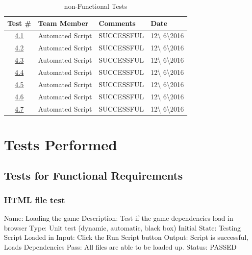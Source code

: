 \documentclass{article}
\begin{document}
\begin{table}[H]
\caption{non-Functional Tests}
	\begin{tabularx}{\textwidth}{| c | l | X | l |}
	\toprule
	Test \#& Team Member &Comments &Date\\
	\midrule
	\hyperref[sec:4.1]{4.1}& Automated Script  & SUCCESSFUL & 12\textbackslash
	6\textbackslash2016\\
	\hyperref[sec:4.2]{4.2}& Automated Script  & SUCCESSFUL & 12\textbackslash
	6\textbackslash2016\\
	\hyperref[sec:4.3]{4.3}& Automated Script  & SUCCESSFUL & 12\textbackslash
	6\textbackslash2016\\
	\hyperref[sec:4.4]{4.4}& Automated Script  & SUCCESSFUL & 12\textbackslash
	6\textbackslash2016\\
	\hyperref[sec:4.5]{4.5}& Automated Script  & SUCCESSFUL & 12\textbackslash
	6\textbackslash2016\\
	\hyperref[sec:4.6]{4.6}& Automated Script  & SUCCESSFUL & 12\textbackslash
	6\textbackslash2016\\
	\hyperref[sec:4.7]{4.7}& Automated Script  & SUCCESSFUL & 12\textbackslash
	6\textbackslash2016\\
	
		\bottomrule
	\end{tabularx}
\end{table}


\section{Tests Performed}
\subsection{Tests for Functional Requirements}
\subsubsection{HTML file test}
\label{sec:3.1.1}
Name:  Loading the game \newline
Description: Test if the game dependencies load in browser
\newline
Type: Unit test (dynamic, automatic, black box) \newline
Initial State:  Testing Script Loaded in \newline
Input: Click the Run Script button \newline
Output: Script is successful, Loads Dependencies \newline
Pass:  All files are able to be loaded up. \newline
\newline Status: PASSED
\end{document}
